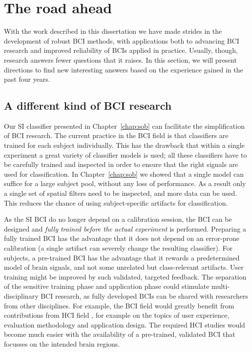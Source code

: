 \section{The road ahead}
With the work described in this dissertation we have made strides in the
development of robust \ac{BCI} methods, with applications both to advancing
\ac{BCI} research and improved reliability of \acp{BCI} applied in practice.
Usually, though, research answers fewer questions that it raises. In this
section, we will present directions to find new interesting answers based on
the experience gained in the past four years.

\subsection{A different kind of BCI research}
Our \acf{SI} classifier presented in Chapter~\ref{chap:sob} can facilitate the
simplification of \ac{BCI} research. The current practice in the \ac{BCI} field
is that classifiers are trained for each subject individually. This has the
drawback that within a single experiment a great variety of classifier models
is used; all these classifiers have to be carefully trained and inspected in
order to ensure that the right signals are used for classification.
%
In Chapter~\ref{chap:sob} we showed that a single model can suffice for a large
subject pool, without any loss of performance. As a result only a single set of
spatial filters need to be inspected, and more data can be used. This reduces
the chance of using subject-specific artifacts for classification. 

As the \ac{SI} \ac{BCI} do no longer depend on a calibration session,
the \ac{BCI} can be designed and \emph{fully trained before the actual
experiment} is performed. Preparing a fully trained \ac{BCI} has the advantage
that it does not depend on an error-prone calibration (a single artifact can
severely change the resulting classifier). For subjects, a pre-trained \ac{BCI}
has the advantage that it rewards a predetermined model of brain signals, and
not some unrelated but class-relevant artifacts. User training might be improved by such validated, targeted feedback.
%
The separation of the sensitive training phase and application phase could
stimulate multi-disciplinary \ac{BCI} research, as fully developed \acp{BCI}
can be shared with researchers from other disciplines. For example, the
\ac{BCI} field would greatly benefit from contributions from \ac{HCI} field
\cite{millan2010cbc}, for example on the topics of user experience, evaluation
methodology and application design. The required \ac{HCI} studies would become
much easier with the availability of a pre-trained, validated \ac{BCI} that
focusses on the intended brain regions.

